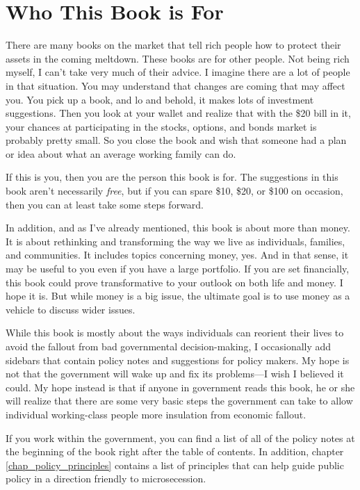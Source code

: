 \section{Who This Book is For}

There are many books on the market that tell rich people how to protect
their assets in the coming meltdown. These books are for other people.
Not being rich
myself, I can’t take
very much of their advice. I imagine there are a lot of people in that
situation. You may understand that changes are coming that may affect
you. You pick up a book, and lo and behold, it makes lots of investment
suggestions. Then you look at your wallet and realize that with the
\$20 bill in it, your chances at participating in the stocks, options,
and bonds market is probably pretty small. So you close the book and
wish that someone had a plan or idea about what an average working
family can do.

If this is you, then you are the person this book is for. The
suggestions in this book aren’t necessarily \textit{free}, but if you
can spare \$10, \$20, or \$100 on occasion, then you can at least take
some steps forward.

In addition, and
as I’ve already
mentioned, this book is about more than money. It is about rethinking
and transforming the way we live as individuals, families, and
communities. It includes topics concerning money, yes. And in that
sense, it may be useful to you even if you have a large portfolio. If
you are set financially, this book could prove transformative to your
outlook on both life and money.
I hope it is. But
while money is a big issue, the ultimate goal is to use money as a
vehicle to discuss wider issues. 

\begin{infonote}
While this book is mostly about the ways individuals can reorient their
lives to avoid the fallout from bad governmental decision-making, I
occasionally add sidebars that contain policy notes
and suggestions for
policy makers. My hope is not that the government will wake up and fix
its problems—I wish I believed it could. My hope instead is that if
anyone in government reads this book, he or
she will realize that there are some very basic steps the government can
take to allow individual working-class people more insulation from
economic fallout.  

If you work within the government, you can find a
list of all of the policy notes at the beginning of the book right
after the table of contents.  In addition, chapter \ref{chap_policy_principles}
contains a list of principles that can help guide public policy
in a direction friendly to microsecession.
\end{infonote}

